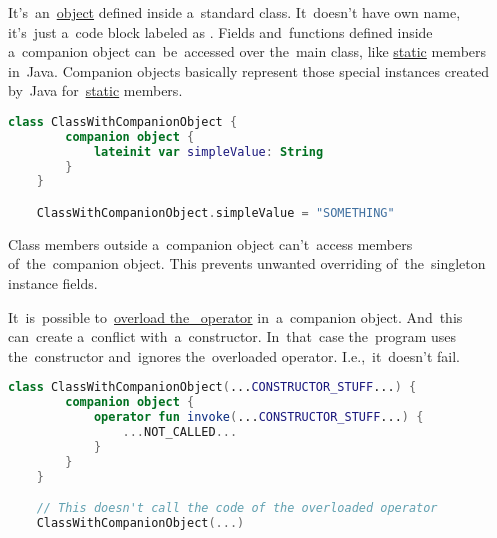 \label{kotlincompanionobject}
It's~an~\hyperref[kotlinobject]{object} defined inside a~standard class.
It~doesn't have own name, it's~just a~code block labeled as .
Fields and~functions defined inside a~companion object can~be~accessed over the~main class, like \hyperref[javastatic]{static} members in~Java.
Companion objects basically represent those special instances created by~Java for~\hyperref[javastatic]{static} members.

\begin{lstlisting}[language=Kotlin]
    class ClassWithCompanionObject {
        companion object {
            lateinit var simpleValue: String
        }
    }

    ClassWithCompanionObject.simpleValue = "SOMETHING"
\end{lstlisting}

\note Class members outside a~companion object can't~access members of~the~companion object.
This prevents unwanted overriding of~the~singleton instance fields.

It~is~possible to~\hyperref[kotlininvokeoverload]{overload the~ operator} in~a~companion object.
And~this can~create a~conflict with~a~constructor.
In~that~case the~program uses the~constructor and~ignores the~overloaded operator.
I.e.,~it~doesn't fail.

\begin{lstlisting}[language=Kotlin]
    class ClassWithCompanionObject(...CONSTRUCTOR_STUFF...) {
        companion object {
            operator fun invoke(...CONSTRUCTOR_STUFF...) {
                ...NOT_CALLED...
            }
        }
    }

    // This doesn't call the code of the overloaded operator
    ClassWithCompanionObject(...)
\end{lstlisting}
\newline
